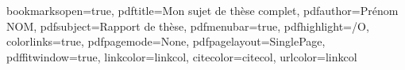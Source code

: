 \hypersetup
{
bookmarksopen=true,
pdftitle={Mon sujet de thèse complet},
pdfauthor={Prénom NOM},
pdfsubject={Rapport de thèse},
pdfmenubar=true,
pdfhighlight=/O,
colorlinks=true,
pdfpagemode=None,
pdfpagelayout=SinglePage,
pdffitwindow=true,
linkcolor=linkcol,
citecolor=citecol,
urlcolor=linkcol
}



\usepackage{fancyhdr}
\pagestyle{fancy}
\fancyfoot{}
\fancyhead[LE,RO]{\bfseries\thepage}
\fancyhead[RE]{\bfseries\nouppercase{\leftmark}}
\fancyhead[LO]{\bfseries\nouppercase{\rightmark}}

\let\headruleORIG\headrule
\renewcommand{\headrule}{\color{black} \headruleORIG}
\renewcommand{\headrulewidth}{1.0pt}
\usepackage{colortbl}

\fancypagestyle{plain}{
  \fancyhead{}
  \fancyfoot[C]{\thepage}
  \renewcommand{\headrulewidth}{0pt}
}

\usepackage[footnote]{acronym}


\usepackage[style=alphabetic-verb,backend=bibtex,isbn=false,doi=false,backref=true,url=false,maxbibnames=99]{biblatex} %

\makeatletter
\def\cleardoublepage{\clearpage\if@twoside \ifodd\c@page\else%
  \hbox{}%
  \thispagestyle{empty}%
  \newpage%
  \if@twocolumn\hbox{}\newpage\fi\fi\fi}
\makeatother

\newenvironment{vcenterpage}
{\newpage\vspace*{\fill}\thispagestyle{empty}\renewcommand{\headrulewidth}{0pt}}
{\vspace*{\fill}}

